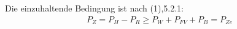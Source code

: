 \documentclass[a4paper,10pt,twoside]{article}
\begin{document}
Die einzuhaltende Bedingung ist nach (1),5.2.1:   
\begin{align}					   
  P_Z = P_H - P_R \ge P_W + P_{FV} + P_B = P_{Ze} 
\end{align}                                       







\end{document}
